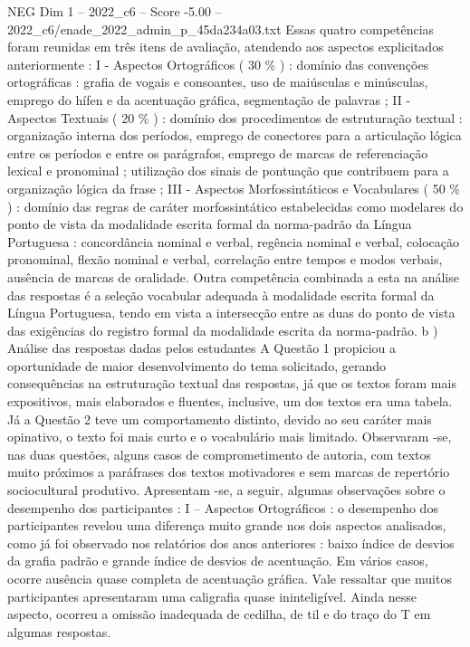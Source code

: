 \begin{textsample}{NEG Dim 1 – 2022\_c6 – Score -5.00 – 2022\_c6/enade\_2022\_admin\_p\_45da234a03.txt}
Essas quatro competências foram reunidas em três itens de avaliação, atendendo aos aspectos explicitados anteriormente : I - Aspectos Ortográficos ( 30 \% ) : domínio das convenções ortográficas : grafia de vogais e consoantes, uso de maiúsculas e minúsculas, emprego do hífen e da acentuação gráfica, segmentação de palavras ; II - Aspectos Textuais ( 20 \% ) : domínio dos procedimentos de estruturação textual : organização interna dos períodos, emprego de conectores para a articulação lógica entre os períodos e entre os parágrafos, emprego de marcas de referenciação lexical e pronominal ; utilização dos sinais de pontuação que contribuem para a organização lógica da frase ; III - Aspectos Morfossintáticos e Vocabulares ( 50 \% ) : domínio das regras de caráter morfossintático estabelecidas como modelares do ponto de vista da modalidade escrita formal da norma-padrão da Língua Portuguesa : concordância nominal e verbal, regência nominal e verbal, colocação pronominal, flexão nominal e verbal, correlação entre tempos e modos verbais, ausência de marcas de oralidade.
Outra competência combinada a esta na análise das respostas é a seleção vocabular adequada à modalidade escrita formal da Língua Portuguesa, tendo em vista a intersecção entre as duas do ponto de vista das exigências do registro formal da modalidade escrita da norma-padrão. b ) Análise das respostas dadas pelos estudantes A Questão 1 propiciou a oportunidade de maior desenvolvimento do tema solicitado, gerando consequências na estruturação textual das respostas, já que os textos foram mais expositivos, mais elaborados e fluentes, inclusive, um dos textos era uma tabela.
Já a Questão 2 teve um comportamento distinto, devido ao seu caráter mais opinativo, o texto foi mais curto e o vocabulário mais limitado.
Observaram -se, nas duas questões, alguns casos de comprometimento de autoria, com textos muito próximos a paráfrases dos textos motivadores e sem marcas de repertório sociocultural produtivo.
Apresentam -se, a seguir, algumas observações sobre o desempenho dos participantes : I – Aspectos Ortográficos : o desempenho dos participantes revelou uma diferença muito grande nos dois aspectos analisados, como já foi observado nos relatórios dos anos anteriores : baixo índice de desvios da grafia padrão e grande índice de desvios de acentuação.
Em vários casos, ocorre ausência quase completa de acentuação gráfica.
Vale ressaltar que muitos participantes apresentaram uma caligrafia quase ininteligível.
Ainda nesse aspecto, ocorreu a omissão inadequada de cedilha, de til e do traço do T em algumas respostas.

\end{textsample}
